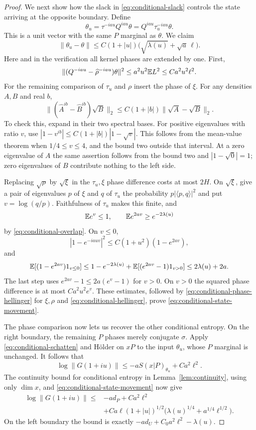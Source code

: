 \begin{proof}
We next show how the slack in \eqref{eq:conditional-slack} controls
the state arriving at the opposite boundary.  Define
\[
 \theta_u=\tau^{-iau}Q^{iau}\theta
          =Q^{iau}\tau_u^{-iau}\theta.
\]
This is a unit vector with the same $P$ marginal as $\theta$.  We
claim
\begin{equation}\label{eq:conditional-state-movement}
 \|\theta_u-\theta\|
 \le C(1+|u|)\big(\sqrt{\lambda(u)}+\sqrt a\,\ell\big).
\end{equation}
Here and in the verification all kernel phases are extended by one.
First,
\[
 \|(Q^{-iau}-\widehat\rho^{-iau})\theta\|^2
 \le a^2u^2\mathbb E L^2\le C a^2u^2\ell^2.
\]
For the remaining comparison of $\tau_u$ and $\rho$ insert the phase
of $\xi$.  For any densities $A,B$ and real $b$,
\begin{equation}\label{eq:conditional-phase-hellinger}
 \| (\widehat A^{ib}-\widehat B^{ib})\sqrt B\|_2
 \le C(1+|b|)\|\sqrt A-\sqrt B\|_2.
\end{equation}
To check this, expand in their two spectral bases.  For positive
eigenvalues with ratio $v$, use
$|1-v^{ib}|\le C(1+|b|)|1-\sqrt v|$.  This follows from the
mean-value theorem when $1/4\le v\le4$, and the bound two outside
that interval.  At a zero eigenvalue of $A$ the same assertion
follows from the bound two and $|1-\sqrt0|=1$; zero eigenvalues of
$B$ contribute nothing to the left side.

Replacing $\sqrt\rho$ by $\sqrt\xi$ in the $\tau_u,\xi$ phase
difference costs at most $2H$.  On $\sqrt\xi$, give a pair of
eigenvalues $p$ of $\xi$ and $q$ of $\tau_u$ the probability
$p|\langle p,q\rangle|^2$ and put $v=\log(q/p)$.  Faithfulness of
$\tau_u$ makes this finite, and
\[
 \mathbb E e^v\le1,\qquad
 \mathbb E e^{2av}\ge e^{-2\lambda(u)}
\]
by \eqref{eq:conditional-overlap}.  On $v\le0$,
\[
 |1-e^{-iauv}|^2\le C(1+u^2)(1-e^{2av}),
\]
and
\[
 \mathbb E[(1-e^{2av})1_{v\le0}]
 \le 1-e^{-2\lambda(u)}
       +\mathbb E[(e^{2av}-1)1_{v>0}]
 \le 2\lambda(u)+2a.
\]
The last step uses $e^{2av}-1\le2a(e^v-1)$ for $v>0$.
On $v>0$ the squared phase difference is at most
$C a^2u^2 e^v$.  These estimates, followed by
\eqref{eq:conditional-phase-hellinger} for $\xi,\rho$ and
\eqref{eq:conditional-hellinger}, prove
\eqref{eq:conditional-state-movement}.

The phase comparison now lets us recover the other conditional
entropy.  On the right boundary, the remaining $P$ phases merely conjugate
$\sigma$.  Apply \eqref{eq:conditional-schatten} and H\"older on
$xP$ to the input $\theta_u$, whose $P$ marginal is unchanged.
It follows that
\[
 \log\|G(1+iu)\|
 \le-aS(x|P)_{\theta_u}+C a^2\ell^2.
\]
The continuity bound for conditional entropy in
Lemma~\ref{lem:continuity}, using only $\dim x$, and
\eqref{eq:conditional-state-movement} now give
\begin{align*}
 \log\|G(1+iu)\|
 \le{}&-ad_P+C a^2\ell^2\\
 &+C a\ell(1+|u|)^{1/2}
       \big(\lambda(u)^{1/4}+a^{1/4}\ell^{1/2}\big).
\end{align*}
On the left boundary the bound is exactly
$-ad_U+C_0a^2\ell^2-\lambda(u)$.


\end{proof}
